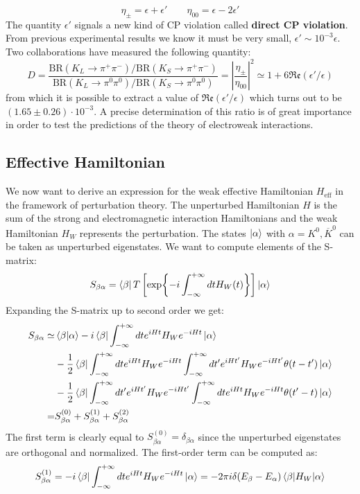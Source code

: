 \documentclass[../main.tex]{subfiles}
\begin{document}
\[
\eta_\pm=\epsilon+\epsilon' \qquad \eta_{00}=\epsilon-2\epsilon'
\]
The quantity $\epsilon'$ signals a new kind of CP violation called \textbf{direct CP violation}. From previous experimental results we know it must be very small, $\epsilon'\sim10^{-3}\epsilon$. Two collaborations have measured the following quantity:
\[
D=\frac{\text{BR}(K_L\to\pi^+\pi^-)/\text{BR}(K_S\to\pi^+\pi^-)}{\text{BR}(K_L\to\pi^0\pi^0)/\text{BR}(K_S\to\pi^0\pi^0)}=\left|\frac{\eta_\pm}{\eta_{00}}\right|^2\simeq1+6\mathfrak{Re}(\epsilon'/\epsilon)
\]
from which it is possible to extract a value of $\mathfrak{Re}(\epsilon'/\epsilon)$ which turns out to be $(1.65\pm0.26)\cdot10^{-3}$. A precise determination of this ratio is of great importance in order to test the predictions of the theory of electroweak interactions.
\subsection{Effective Hamiltonian}
We now want to derive an expression for the weak effective Hamiltonian $H_{\text{eff}}$ in the framework of perturbation theory. The unperturbed Hamiltonian $H$ is the sum of the strong and electromagnetic interaction Hamiltonians and the weak Hamiltonian $H_W$ represents the perturbation. The states $\ket{\alpha}$ with $\alpha=K^0,\overline{K}^0$ can be taken as unperturbed eigenstates. We want to compute elements of the S-matrix:
\[
S_{\beta\alpha}=\bra{\beta}T\left[\exp{-i\int_{-\infty}^{+\infty}dtH_W(t)}\right]\ket{\alpha}
\]
Expanding the S-matrix up to second order we get:
\begin{align*}
S_{\beta\alpha}\simeq&\braket{\beta|\alpha}-i\bra{\beta}\int_{-\infty}^{+\infty}dte^{iHt}H_We^{-iHt}\ket{\alpha}\\
&-\frac{1}{2}\bra{\beta}\int_{-\infty}^{+\infty}dte^{iHt}H_We^{-iHt}\int_{-\infty}^{+\infty}dt'e^{iHt'}H_We^{-iHt'}\theta(t-t')\ket{\alpha}\\
&-\frac{1}{2}\bra{\beta}\int_{-\infty}^{+\infty}dt'e^{iHt'}H_We^{-iHt'}\int_{-\infty}^{+\infty}dte^{iHt}H_We^{-iHt}\theta(t'-t)\ket{\alpha}\\
=&S_{\beta\alpha}^{(0)}+S_{\beta\alpha}^{(1)}+S_{\beta\alpha}^{(2)}
\end{align*}
The first term is clearly equal to $S_{\beta\alpha}^{(0)}=\delta_{\beta\alpha}$ since the unperturbed eigenstates are orthogonal and normalized. The first-order term can be computed as:
\[
S_{\beta\alpha}^{(1)}=-i\bra{\beta}\int_{-\infty}^{+\infty}dte^{iHt}H_We^{-iHt}\ket{\alpha}=-2\pi i\delta(E_\beta-E_\alpha)\braket{\beta|H_W|\alpha}
\]
\end{document}
